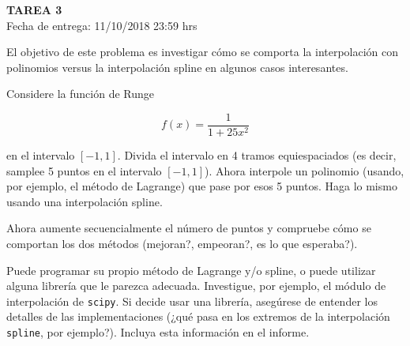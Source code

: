 \documentclass[letter, 11pt]{article}
\newcommand{\tareanro}{3}
\newcommand{\fechaentrega}{11/10/2018 23:59 hrs}
\begin{document}
\thispagestyle{firstpage}

\begin{center}
  {\uppercase{\LARGE \bf Tarea \tareanro}}\\
  Fecha de entrega: \fechaentrega
\end{center}



El objetivo de este problema es investigar cómo se comporta la interpolación
con polinomios versus la interpolación spline en algunos casos interesantes.

Considere la función de Runge

$$ f(x) = \frac{1}{1 + 25 x^2} $$

\noindent en el intervalo $[-1, 1]$. Divida el intervalo en 4 tramos
equiespaciados (es decir, samplee 5 puntos en el intervalo $[-1, 1]$). Ahora
interpole un polinomio (usando, por ejemplo, el método de Lagrange) que pase
por esos 5 puntos. Haga lo mismo usando una interpolación spline.

Ahora aumente secuencialmente el número de puntos y compruebe cómo se comportan
los dos métodos (mejoran?, empeoran?, es lo que esperaba?).

\begin{ayuda}

  Puede programar su propio método de Lagrange y/o spline, o puede utilizar
  alguna librería que le parezca adecuada. Investigue, por ejemplo, el módulo
  de interpolación de \texttt{scipy}. Si decide usar una librería, asegúrese de
  entender los detalles de las implementaciones (¿qué pasa en los extremos de
  la interpolación \texttt{spline}, por ejemplo?). Incluya esta información en
  el informe.
\end{ayuda}
\end{document}
